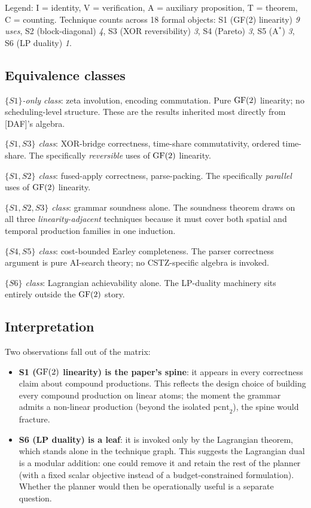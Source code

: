 Legend: I = identity, V = verification,
A = auxiliary proposition, T = theorem, C = counting.
Technique counts across 18 formal objects:
S1 (GF(2) linearity) \emph{9 uses},
S2 (block-diagonal) \emph{4},
S3 (XOR reversibility) \emph{3},
S4 (Pareto) \emph{3},
S5 (A$^*$) \emph{3},
S6 (LP duality) \emph{1}.

\subsection{Equivalence classes}

\emph{$\{S1\}$-only class}: zeta involution, encoding
commutation. Pure $\operatorname{GF}(2)$ linearity; no
scheduling-level structure. These are the results
inherited most directly from [DAF]'s algebra.

\emph{$\{S1, S3\}$ class}: XOR-bridge correctness,
time-share commutativity, ordered time-share. The
specifically \emph{reversible} uses of $\operatorname{GF}(2)$
linearity.

\emph{$\{S1, S2\}$ class}: fused-apply correctness,
parse-packing. The specifically \emph{parallel}
uses of $\operatorname{GF}(2)$ linearity.

\emph{$\{S1, S2, S3\}$ class}: grammar soundness
alone. The soundness theorem draws on all three
\emph{linearity-adjacent} techniques because it
must cover both spatial and temporal production
families in one induction.

\emph{$\{S4, S5\}$ class}: cost-bounded Earley
completeness. The parser correctness argument is
pure AI-search theory; no CSTZ-specific algebra is
invoked.

\emph{$\{S6\}$ class}: Lagrangian achievability
alone. The LP-duality machinery sits entirely
outside the $\operatorname{GF}(2)$ story.

\subsection{Interpretation}

Two observations fall out of the matrix:

\begin{itemize}[nosep]
  \item \textbf{S1 ($\operatorname{GF}(2)$ linearity) is the
    paper's spine}: it appears in every
    correctness claim about compound productions.
    This reflects the design choice of building
    every compound production on linear atoms; the
    moment the grammar admits a non-linear
    production (beyond the isolated
    $\mathrm{pcnt}_2$), the spine would fracture.
  \item \textbf{S6 (LP duality) is a leaf}: it is
    invoked only by the Lagrangian theorem, which
    stands alone in the technique graph. This
    suggests the Lagrangian dual is a modular
    addition: one could remove it and retain the
    rest of the planner (with a fixed scalar
    objective instead of a budget-constrained
    formulation). Whether the planner would
    then be operationally useful is a separate
    question.
\end{itemize}

